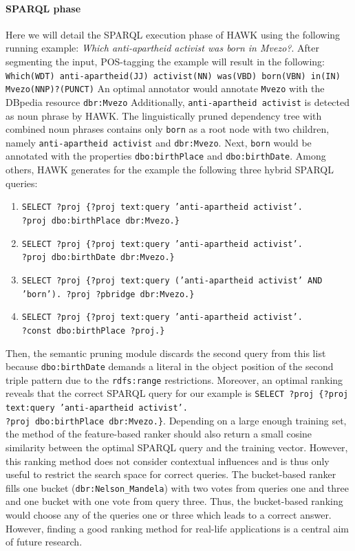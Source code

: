 \paragraph{SPARQL phase} Here we will detail the SPARQL execution phase of HAWK using the following running example: \emph{Which anti-apartheid activist was born in Mvezo?}.
After segmenting the input, POS-tagging the example will result in the following: \texttt{Which(WDT) anti-apartheid(JJ) activist(NN) was(VBD) born(VBN) in(IN) \\ Mvezo(NNP)?(PUNCT)}
An optimal annotator would annotate \texttt{Mvezo} with the DBpedia resource \texttt{dbr:Mvezo} 
Additionally, \texttt{anti-apartheid activist} is detected as noun phrase by HAWK.
The linguistically pruned dependency tree with combined noun phrases contains only \texttt{born} as a root node with two children, namely \texttt{anti-apartheid activist} and \texttt{dbr:Mvezo}.
Next, \texttt{born} would be annotated with the properties \texttt{dbo:birthPlace} and \texttt{dbo:birthDate}.
Among others, HAWK generates for the  example the following three hybrid SPARQL queries:
\begin{enumerate}
\item \texttt{SELECT ?proj  \{?proj text:query 'anti-apartheid activist'.\\ ?proj dbo:birthPlace dbr:Mvezo.\}}
\item \texttt{SELECT ?proj  \{?proj text:query 'anti-apartheid activist'.\\ ?proj dbo:birthDate dbr:Mvezo.\}}
\item \texttt{SELECT ?proj  \{?proj text:query ('anti-apartheid activist' AND \\ 'born'). ?proj ?pbridge dbr:Mvezo.\}}
\item \texttt{SELECT ?proj  \{?proj text:query 'anti-apartheid activist'.\\ ?const dbo:birthPlace ?proj.\}}
\end{enumerate}

Then, the semantic pruning module discards the second query from this list because \texttt{dbo:birthDate} demands a literal in the object position of the second triple pattern due to the \texttt{rdfs:range} restrictions.
Moreover, an optimal ranking reveals that the correct SPARQL query for our example is \texttt{SELECT ?proj  \{?proj text:query 'anti-apartheid activist'.\\ ?proj dbo:birthPlace dbr:Mvezo.\}}.
Depending on a large enough training set, the method of the feature-based ranker should also return a small cosine similarity between the optimal SPARQL query and the training vector. 
However, this ranking method does not consider contextual influences and is thus only useful to restrict the search space for correct queries.
The bucket-based ranker fills one bucket (\texttt{dbr:Nelson\_Mandela}) with two votes from queries one and three and one bucket with one vote from query three. 
Thus, the bucket-based ranking would choose any of the queries one or three which leads to a correct answer.
However, finding a good ranking method for real-life applications is a central aim of future research.


